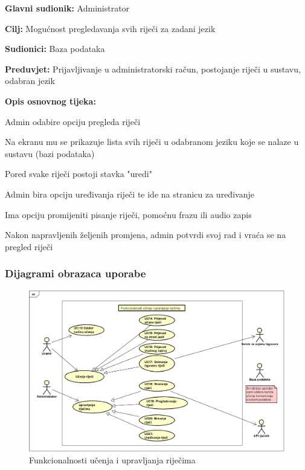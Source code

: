 \noindent {}
\begin{packed_item}

	\item \textbf{Glavni sudionik: } Administrator
	\item \textbf{Cilj: } Mogućnost pregledavanja svih riječi za zadani jezik
	\item \textbf{Sudionici: } Baza podataka
	\item \textbf{Preduvjet: } Prijavljivanje u administratorski račun, postojanje riječi u sustavu, odabran jezik
	\item  \textbf{Opis osnovnog tijeka:}
	
	\item[] \begin{packed_enum}
		
		\item Admin odabire opciju pregleda riječi
		\item Na ekranu mu se prikazuje lista svih riječi u odabranom jeziku koje se nalaze u sustavu (bazi podataka)
		\item Pored svake riječi postoji stavka "uredi"
		\item Admin bira opciju uređivanja riječi te ide na stranicu za uređivanje
		\item Ima opciju promijeniti pisanje riječi, pomoćnu frazu ili audio zapis
		\item Nakon napravljenih željenih promjena, admin potvrdi svoj rad i vraća se na pregled riječi

	\end{packed_enum}
	
\end{packed_item}

\eject


\subsubsection{Dijagrami obrazaca uporabe}

\begin{figure}[H]
	\includegraphics[scale=0.6]{dijagrami/upravljanje_rijecima.png} 
	\centering
	\caption{Funkcionalnosti učenja i upravljanja riječima}
	\label{fig:dijagram1}
\end{figure}

